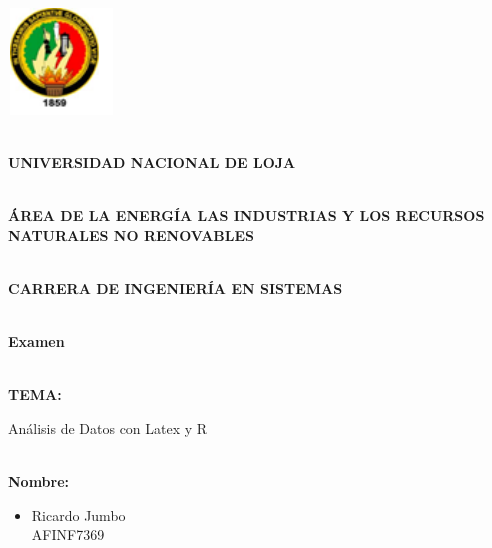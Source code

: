\documentclass[9pt]{article}
\author{Ricardo Jumbo}
\title{}
\begin{document}



	\begin{center}
		\includegraphics[width=80pt,height=80pt]{unl.png}
	\end{center}
	
	
	\begin{center}
		\begin{center}
			{\LARGE \textbf{\\
					UNIVERSIDAD NACIONAL DE LOJA}}
		\end{center}
		
	\end{center}
	
	\begin{center}
		\textbf{\\
			{
				\large \'AREA DE LA ENERG\'IA LAS INDUSTRIAS Y LOS
				RECURSOS NATURALES NO RENOVABLES}\\
		}
	\end{center}
	
	\begin{center}
		\textbf{\\
			{\Large CARRERA DE INGENIER\'IA EN SISTEMAS}}
	\end{center}
	
	\begin{center}
		\textbf{\\
			{\Large Examen }}
	\end{center}
	
	\textbf{\\
		{\Large TEMA:}}
	
	\begin{center}
		{\Large An\'alisis de Datos con Latex y R }
	\end{center}
	
	\textbf{\\
		{\Large Nombre: }}
	
	\begin{itemize}	
		\item {\Large Ricardo Jumbo}\\
		
		{\Large AFINF7369  }
	\end{itemize}
	
\end{document}
